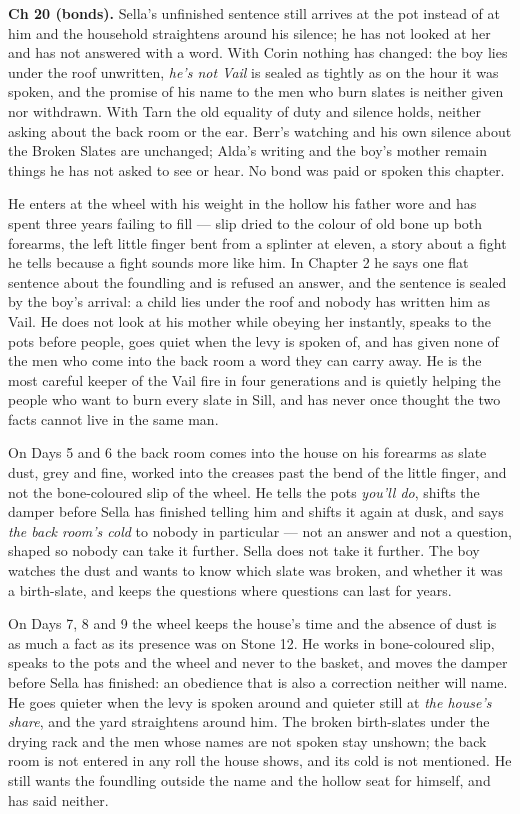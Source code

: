 \documentclass{design/chronicle}
\begin{document}
{\textbf{Ch 20 (bonds).} Sella’s unfinished sentence still arrives at the pot instead of at him and the household straightens around his silence; he has not looked at her and has not answered with a word. With Corin nothing has changed: the boy lies under the roof unwritten, \emph{he’s not Vail} is sealed as tightly as on the hour it was spoken, and the promise of his name to the men who burn slates is neither given nor withdrawn. With Tarn the old equality of duty and silence holds, neither asking about the back room or the ear. Berr’s watching and his own silence about the Broken Slates are unchanged; Alda’s writing and the boy’s mother remain things he has not asked to see or hear. No bond was paid or spoken this chapter.

He enters at the wheel with his weight in the hollow his father wore and has spent three years failing to fill --- slip dried to the colour of old bone up both forearms, the left little finger bent from a splinter at eleven, a story about a fight he tells because a fight sounds more like him. In Chapter 2 he says one flat sentence about the foundling and is refused an answer, and the sentence is sealed by the boy’s arrival: a child lies under the roof and nobody has written him as Vail. He does not look at his mother while obeying her instantly, speaks to the pots before people, goes quiet when the levy is spoken of, and has given none of the men who come into the back room a word they can carry away. He is the most careful keeper of the Vail fire in four generations and is quietly helping the people who want to burn every slate in Sill, and has never once thought the two facts cannot live in the same man.

On Days 5 and 6 the back room comes into the house on his forearms as slate dust, grey and fine, worked into the creases past the bend of the little finger, and not the bone-coloured slip of the wheel. He tells the pots \emph{you’ll do}, shifts the damper before Sella has finished telling him and shifts it again at dusk, and says \emph{the back room’s cold} to nobody in particular --- not an answer and not a question, shaped so nobody can take it further. Sella does not take it further. The boy watches the dust and wants to know which slate was broken, and whether it was a birth-slate, and keeps the questions where questions can last for years.

On Days 7, 8 and 9 the wheel keeps the house’s time and the absence of dust is as much a fact as its presence was on Stone 12. He works in bone-coloured slip, speaks to the pots and the wheel and never to the basket, and moves the damper before Sella has finished: an obedience that is also a correction neither will name. He goes quieter when the levy is spoken around and quieter still at \emph{the house’s share}, and the yard straightens around him. The broken birth-slates under the drying rack and the men whose names are not spoken stay unshown; the back room is not entered in any roll the house shows, and its cold is not mentioned. He still wants the foundling outside the name and the hollow seat for himself, and has said neither.

}
\end{document}
